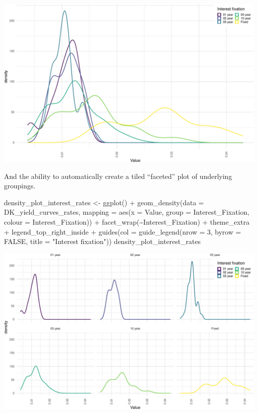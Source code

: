 \documentclass[
]{book}
\newenvironment{Shaded}{\begin{snugshade}}{\end{snugshade}}
\newcommand{\AttributeTok}[1]{\textcolor[rgb]{0.77,0.63,0.00}{#1}}
\newcommand{\ConstantTok}[1]{\textcolor[rgb]{0.00,0.00,0.00}{#1}}
\newcommand{\DecValTok}[1]{\textcolor[rgb]{0.00,0.00,0.81}{#1}}
\newcommand{\FunctionTok}[1]{\textcolor[rgb]{0.00,0.00,0.00}{#1}}
\newcommand{\NormalTok}[1]{#1}
\newcommand{\OtherTok}[1]{\textcolor[rgb]{0.56,0.35,0.01}{#1}}
\newcommand{\SpecialCharTok}[1]{\textcolor[rgb]{0.00,0.00,0.00}{#1}}
\newcommand{\StringTok}[1]{\textcolor[rgb]{0.31,0.60,0.02}{#1}}
\begin{document}
\includegraphics{figures/unnamed-chunk-2-1.pdf}

And the ability to automatically create a tiled ``faceted'' plot of underlying groupings.

\begin{Shaded}
\begin{Highlighting}[]
\NormalTok{density\_plot\_interest\_rates }\OtherTok{\textless{}{-}} \FunctionTok{ggplot}\NormalTok{() }\SpecialCharTok{+} 
        \FunctionTok{geom\_density}\NormalTok{(}\AttributeTok{data =}\NormalTok{ DK\_yield\_curves\_rates,}
                     \AttributeTok{mapping =} \FunctionTok{aes}\NormalTok{(}\AttributeTok{x =}\NormalTok{ Value,}
                            \AttributeTok{group =}\NormalTok{ Interest\_Fixation,}
                            \AttributeTok{colour =}\NormalTok{ Interest\_Fixation)) }\SpecialCharTok{+}
    \FunctionTok{facet\_wrap}\NormalTok{(}\SpecialCharTok{\textasciitilde{}}\NormalTok{Interest\_Fixation) }\SpecialCharTok{+}
\NormalTok{    theme\_extra }\SpecialCharTok{+}
\NormalTok{    legend\_top\_right\_inside }\SpecialCharTok{+}
    \FunctionTok{guides}\NormalTok{(}\AttributeTok{col =} \FunctionTok{guide\_legend}\NormalTok{(}\AttributeTok{nrow =} \DecValTok{3}\NormalTok{, }
                              \AttributeTok{byrow =} \ConstantTok{FALSE}\NormalTok{,}
                              \AttributeTok{title =} \StringTok{"Interest fixation"}\NormalTok{))}
\NormalTok{density\_plot\_interest\_rates}
\end{Highlighting}
\end{Shaded}

\includegraphics{figures/unnamed-chunk-3-1.pdf}
\end{document}
